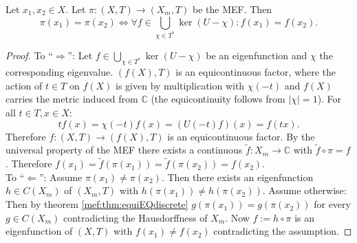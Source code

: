 \begin{theorem}
  \label{thm:MEF_EFchar}
  Let $x_1,x_2 \in X$. Let $\pi : (X,T) \to (X_m,T)$ be the MEF.
  Then
  \begin{equation*}
  \pi (x_1) = \pi (x_2) \Leftrightarrow 
    \forall f \in \bigcup_{\chi \in T^*} \ker (U- \chi) : f(x_1) = f(x_2).
  \end{equation*}
\end{theorem}
\begin{proof}
  To \enquote{$\Rightarrow$}:
  Let $f \in \bigcup_{\chi \in T^*} \ker (U- \chi)$ be an eigenfunction and $\chi$ the corresponding eigenvalue.
  $(f(X),T)$ is an equicontinuous factor, where the action of $t \in T$ on $f(X)$ is given by multiplication with $\chi(-t)$ and $f(X)$ carries the metric induced from $\mathbb{C}$ (the equicontinuity follows from $|\chi|=1$).
  For all $t \in T, x \in X$:
  \begin{equation*}
    t f(x) = \chi (-t) f (x) = (U(-t) f)(x) = f(tx).
  \end{equation*}
  Therefore $f: (X,T) \to (f(X),T)$ is an equicontinuous factor.
  By the universal property of the MEF there exists a continuous $\tilde{f}  : X_m  \to \mathbb{C}$ with $\tilde{f} \circ \pi = f$.
  Therefore $f(x_1) = \tilde{f} (\pi (x_1) )=  \tilde{f} ( \pi (x_2)) = f (x_2)$.\\
  To \enquote{$\Leftarrow$}:
  Assume $\pi (x_1) \neq \pi (x_2)$.
  Then there exists an eigenfunction $h \in C(X_m)$ of $(X_m,T)$ with $h (\pi(x_1)) \neq h(\pi (x_2))$.
  Assume otherwise: Then by theorem \ref{mef:thm:equiEQdiscrete} $g (\pi (x_1)) = g(\pi (x_2))$ for every $g \in C(X_m)$ contradicting the Hausdorffness of $X_m$.
  Now $f:= h \circ \pi$ is an eigenfunction of $(X,T)$ with $f(x_1) \neq f(x_2)$ contradicting the assumption.
\end{proof}

